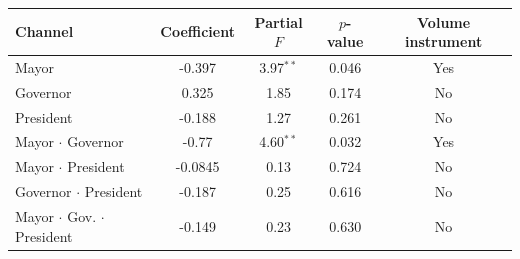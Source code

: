 \begin{tabular}{@{}lcccc@{}}
\toprule
Channel & Coefficient & Partial $F$ & $p$-value & Volume instrument \\
\midrule
Mayor & -0.397 & 3.97$^{**}$ & 0.046 & Yes \\
Governor & 0.325 & 1.85 & 0.174 & No \\
President & -0.188 & 1.27 & 0.261 & No \\
Mayor $\cdot$ Governor & -0.77 & 4.60$^{**}$ & 0.032 & Yes \\
Mayor $\cdot$ President & -0.0845 & 0.13 & 0.724 & No \\
Governor $\cdot$ President & -0.187 & 0.25 & 0.616 & No \\
Mayor $\cdot$ Gov. $\cdot$ President & -0.149 & 0.23 & 0.630 & No \\
\bottomrule
\end{tabular}
